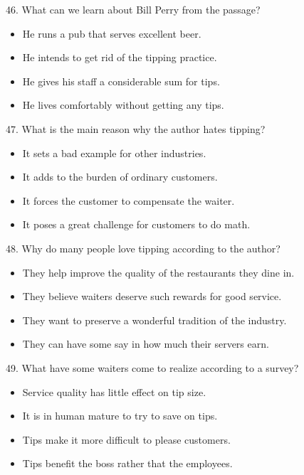 \documentclass[UTF8,11pt]{ctexart}
\begin{document}
46. What can we learn about Bill Perry from the passage?


\begin{itemize}[leftmargin=2em,itemsep=.2em,topsep=.4em]\item[A.] He runs a pub that serves excellent beer.
\item[B.] He intends to get rid of the tipping practice.
\item[C.] He gives his staff a considerable sum for tips.
\item[D.] He lives comfortably without getting any tips.
\end{itemize}

47. What is the main reason why the author hates tipping?


\begin{itemize}[leftmargin=2em,itemsep=.2em,topsep=.4em]\item[A.] It sets a bad example for other industries.
\item[B.] It adds to the burden of ordinary customers.
\item[C.] It forces the customer to compensate the waiter.
\item[D.] It poses a great challenge for customers to do math.
\end{itemize}

48. Why do many people love tipping according to the author?


\begin{itemize}[leftmargin=2em,itemsep=.2em,topsep=.4em]\item[A.] They help improve the quality of the restaurants they dine in.
\item[B.] They believe waiters deserve such rewards for good service.
\item[C.] They want to preserve a wonderful tradition of the industry.
\item[D.] They can have some say in how much their servers earn.
\end{itemize}

49. What have some waiters come to realize according to a survey?


\begin{itemize}[leftmargin=2em,itemsep=.2em,topsep=.4em]\item[A.] Service quality has little effect on tip size.
\item[B.] It is in human mature to try to save on tips.
\item[C.] Tips make it more difficult to please customers.
\item[D.] Tips benefit the boss rather that the employees.
\end{itemize}
\end{document}
